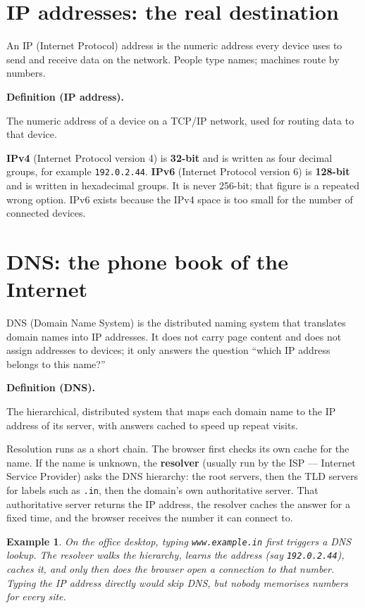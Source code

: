 \documentclass[11pt]{article}
\newtheorem{example}{Example}[section]
\newenvironment{definitionbox}[1]{%
  \par\noindent\textbf{Definition (#1).}\ \itshape
}{\par\vspace{0.3em}}
\begin{document}
\section{IP addresses: the real destination}
An IP (Internet Protocol) address is the numeric address every device uses
to send and receive data on the network. People type names; machines route
by numbers.

\begin{definitionbox}{IP address}
The numeric address of a device on a TCP/IP network, used for routing data
to that device.
\end{definitionbox}

\textbf{IPv4} (Internet Protocol version 4) is \textbf{32-bit} and is
written as four decimal groups, for example \texttt{192.0.2.44}.
\textbf{IPv6} (Internet Protocol version 6) is \textbf{128-bit} and is
written in hexadecimal groups. It is never 256-bit; that figure is a
repeated wrong option. IPv6 exists because the IPv4 space is too small for
the number of connected devices.

\section{DNS: the phone book of the Internet}
DNS (Domain Name System) is the distributed naming system that translates
domain names into IP addresses. It does not carry page content and does not
assign addresses to devices; it only answers the question ``which IP address
belongs to this name?''

\begin{definitionbox}{DNS}
The hierarchical, distributed system that maps each domain name to the IP
address of its server, with answers cached to speed up repeat visits.
\end{definitionbox}

Resolution runs as a short chain. The browser first checks its own cache
for the name. If the name is unknown, the \textbf{resolver} (usually run by
the ISP --- Internet Service Provider) asks the DNS hierarchy: the root
servers, then the TLD servers for labels such as \texttt{.in}, then the
domain's own authoritative server. That authoritative server returns the IP
address, the resolver caches the answer for a fixed time, and the browser
receives the number it can connect to.

\begin{example}
On the office desktop, typing \texttt{www.example.in} first triggers a DNS
lookup. The resolver walks the hierarchy, learns the address (say
\texttt{192.0.2.44}), caches it, and only then does the browser open a
connection to that number. Typing the IP address directly would skip DNS,
but nobody memorises numbers for every site.
\end{example}
\end{document}
